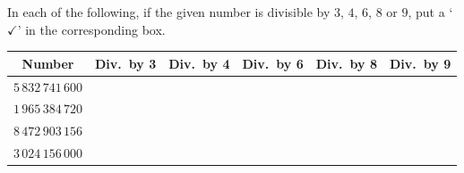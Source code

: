  In each of the following, if the given number is divisible by $3$, $4$, $6$, $8$ or $9$, put a `$\checkmark$' in the corresponding box.
\par\finishquestion

\begin{center}
\small
\begin{tabular}{|c|c|c|c|c|c|}
\hline
\textbf{Number} & \textbf{Div.\ by 3} & \textbf{Div.\ by 4} & \textbf{Div.\ by 6} & \textbf{Div.\ by 8} & \textbf{Div.\ by 9}\\
\hline
$5\,832\,741\,600$ & & & & & \\ \hline
$1\,965\,384\,720$ & & & & & \\ \hline
$8\,472\,903\,156$ & & & & & \\ \hline
$3\,024\,156\,000$ & & & & & \\ \hline
\end{tabular}
\end{center}
